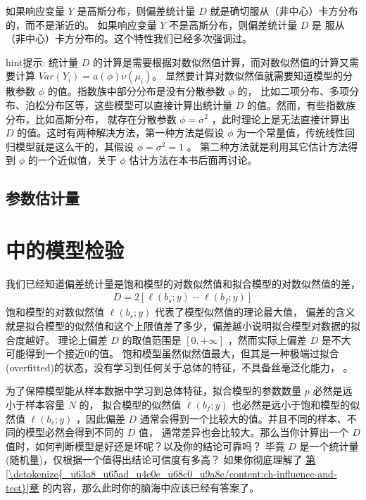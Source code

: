 \documentclass[letterpaper,10pt,english]{sphinxmanual}
\begin{document}
如果响应变量 \(Y\) 是高斯分布，则偏差统计量 \(D\)
就是确切服从（非中心）卡方分布的，而不是渐近的。
如果响应变量 \(Y\) 不是高斯分布，则偏差统计量 \(D\)
是  服从（非中心）卡方分布的。这个特性我们已经多次强调过。

\begin{sphinxadmonition}{hint}{提示:}
统计量 \(D\) 的计算是需要根据对数似然值计算，而对数似然值的计算又需要计算 \(Var(Y_i)=a(\phi)\nu(\mu_i)\)。
显然要计算对数似然值就需要知道模型的分散参数 \(\phi\) 的值。指数族中部分分布是没有分散参数 \(\phi\) 的，
比如二项分布、多项分布、泊松分布区等，这些模型可以直接计算出统计量 \(D\) 的值。然而，有些指数族分布，比如高斯分布，
就存在分散参数 \(\phi=\sigma^2\) ，此时理论上是无法直接计算出 \(D\) 的值。这时有两种解决方法，第一种方法是假设
\(\phi\) 为一个常量值，传统线性回归模型就是这么干的，其假设 \(\phi=\sigma^2=1\) 。
第二种方法就是利用其它估计方法得到 \(\phi\) 的一个近似值，关于 \(\phi\) 估计方法在本书后面再讨论。
\end{sphinxadmonition}


\subsection{参数估计量}
\label{\detokenize{_u6a21_u578b_u8bc4_u4f30/influence:id5}}

\section{ 中的模型检验}
\label{\detokenize{_u6a21_u578b_u8bc4_u4f30/influence:id6}}
我们已经知道偏差统计量是饱和模型的对数似然值和拟合模型的对数似然值的差，
\begin{equation}\label{equation:模型评估/influence:模型评估/influence:36}
\begin{split}D = 2[\ell(b_{s};y) - \ell(b_{f};y)]\end{split}
\end{equation}
饱和模型的对数似然值 \(\ell(b_{s};y)\) 代表了模型似然值的理论最大值，
偏差的含义就是拟合模型的似然值和这个上限值差了多少，偏差越小说明拟合模型对数据的拟合度越好。
理论上偏差 \(D\) 的取值范围是 \([0,+\infty]\)
，然而实际上偏差 \(D\) 是不大可能得到一个接近0的值。
饱和模型虽然似然值最大，但其是一种极端过拟合(overfitted)的状态，没有学习到任何关于总体的特征，不具备丝毫泛化能力，
。

为了保障模型能从样本数据中学习到总体特征，拟合模型的参数数量 \(p\) 必然是远小于样本容量 \(N\) 的，
拟合模型的似然值 \(\ell(b_{f};y)\) 也必然是远小于饱和模型的似然值 \(\ell(b_{s};y)\)
，因此偏差 \(D\) 通常会得到一个比较大的值。并且不同的样本、不同的模型必然会得到不同的 \(D\) 值，
通常差异也会比较大。那么当你计算出一个 \(D\) 值时，如何判断模型是好还是坏呢？以及你的结论可靠吗？
毕竟 \(D\) 是一个统计量(随机量)，仅根据一个值得出结论可信度有多高？
如果你彻底理解了 \hyperref[\detokenize{_u63a8_u65ad_u4e0e_u68c0_u9a8c/content:ch-influence-and-test}]{第\ref{\detokenize{_u63a8_u65ad_u4e0e_u68c0_u9a8c/content:ch-influence-and-test}}章} 的内容，那么此时你的脑海中应该已经有答案了。
\end{document}
